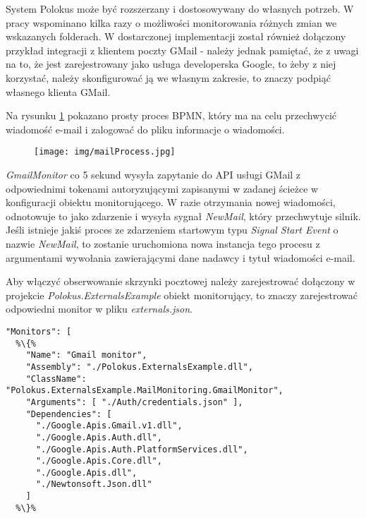 \documentclass[declaration,shortabstract,mgr]{iithesis}
\newcommand{\bpmnnospace}{BPMN}
\begin{document}
System Polokus może być rozszerzany i dostosowywany do własnych potrzeb. W pracy wspominano kilka razy o możliwości monitorowania różnych zmian we wskazanych folderach. W dostarczonej implementacji został również dołączony przykład integracji z klientem poczty GMail - należy jednak pamiętać, że z uwagi na to, że jest zarejestrowany jako usługa developerska Google, to żeby z niej korzystać, należy skonfigurować ją we własnym zakresie, to znaczy podpiąć własnego klienta GMail.

Na rysunku \ref{fig:mailProcess} pokazano prosty proces \bpmnnospace, który ma na celu przechwycić wiadomość e-mail i zalogować do pliku informacje o wiadomości.

\begin{figure}[H]
    \texttt{[image: img/mailProcess.jpg]}
    \caption{}
    \label{fig:mailProcess}
\end{figure}

\textit{GmailMonitor} co 5 sekund wysyła zapytanie do API usługi GMail z odpowiednimi tokenami autoryzującymi zapisanymi w zadanej ścieżce w konfiguracji obiektu monitorującego. W razie otrzymania nowej wiadomości, odnotowuje to jako zdarzenie i wysyła sygnał \textit{NewMail}, który przechwytuje silnik. Jeśli istnieje jakiś proces ze zdarzeniem startowym typu \textit{Signal Start Event} o nazwie \textit{NewMail}, to zostanie uruchomiona nowa instancja tego procesu z argumentami wywołania zawierającymi dane nadawcy i tytuł wiadomości e-mail.

\newpage
 Aby włączyć obserwowanie skrzynki pocztowej należy zarejestrować dołączony w projekcie \textit{Polokus.ExternalsExample} obiekt monitorujący, to znaczy zarejestrować odpowiedni monitor w pliku \textit{externals.json}.

\begin{minipage}[c]{\textwidth}
\centering
\begin{lstlisting}
"Monitors": [
  %\{%
    "Name": "Gmail monitor",
    "Assembly": "./Polokus.ExternalsExample.dll",
    "ClassName": "Polokus.ExternalsExample.MailMonitoring.GmailMonitor",
    "Arguments": [ "./Auth/credentials.json" ],
    "Dependencies": [
      "./Google.Apis.Gmail.v1.dll",
      "./Google.Apis.Auth.dll",
      "./Google.Apis.Auth.PlatformServices.dll",
      "./Google.Apis.Core.dll",
      "./Google.Apis.dll",
      "./Newtonsoft.Json.dll"
    ]
  %\}%			
  
\end{lstlisting}
\end{minipage}
\end{document}
